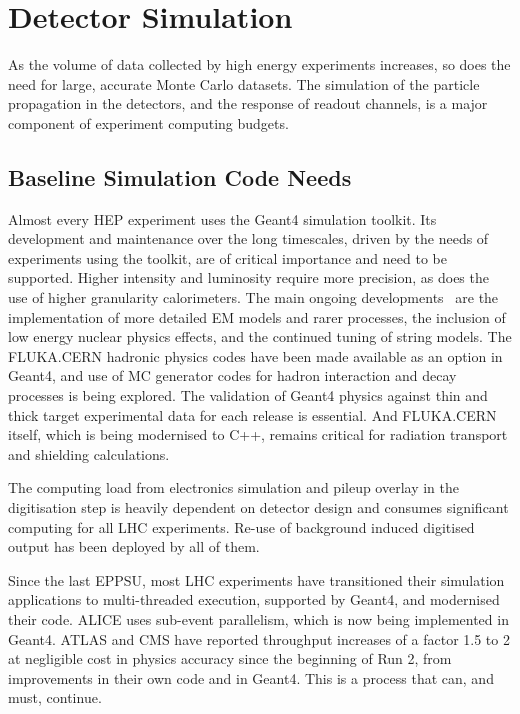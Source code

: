 \documentclass[10pt,a4paper]{article}
\begin{document}
\section{Detector Simulation}\label{detector-simulation}

As the volume of data collected by high energy experiments increases, so
does the need for large, accurate Monte Carlo datasets. The simulation
of the particle propagation in the detectors, and the response of readout
channels, is a major component of experiment computing budgets.

\subsection{Baseline Simulation Code
Needs}\label{baseline-simulation-code-needs}

Almost every HEP experiment uses the Geant4\cite{ALLISON2016187, 1610988, GEANT4:2002zbu}
simulation toolkit. Its
development and maintenance over the long timescales, driven by the needs of
experiments using the toolkit, are of critical importance and need to be
supported. Higher intensity and luminosity require more precision, as does the
use of higher granularity calorimeters. The main ongoing
developments~\cite{g4inputs} are the implementation of more detailed EM models
and rarer processes, the inclusion of low energy nuclear physics effects, and
the continued tuning of string models. The
FLUKA.CERN\cite{FLUKA:new_capabiliies, battistoni_2024_stv3r-7ar12} hadronic
physics codes have been made available as an option in Geant4, and use of MC
generator codes for hadron interaction and decay processes is being explored.
The validation of Geant4 physics against thin and thick target experimental data
for each release is essential. And FLUKA.CERN itself, which is being modernised to
C++, remains critical for radiation transport and shielding calculations.

The computing load from electronics simulation and pileup overlay in the
digitisation step is heavily dependent on detector design and consumes
significant computing for all LHC experiments. Re-use of background
induced digitised output has been deployed by all of them.

Since the last EPPSU\cite{European:2720131}, most LHC experiments have transitioned
their simulation applications to multi-threaded execution, supported by Geant4,
and modernised their code. ALICE uses sub-event parallelism, which is now being
implemented in Geant4. ATLAS and CMS have reported\cite{atlas,cms} throughput
increases of a factor 1.5 to 2 at negligible cost in physics accuracy since the
beginning of Run 2, from improvements in their own code and in Geant4. This is a
process that can, and must, continue.
\end{document}

